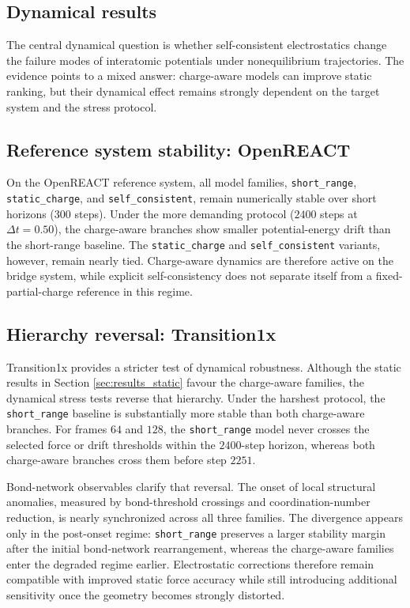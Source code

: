 \subsection{Dynamical results}
\label{sec:results_dynamics}

The central dynamical question is whether self-consistent electrostatics change the failure modes of interatomic potentials under nonequilibrium trajectories. The evidence points to a mixed answer: charge-aware models can improve static ranking, but their dynamical effect remains strongly dependent on the target system and the stress protocol.

\subsection{Reference system stability: OpenREACT}
On the OpenREACT reference system, all model families, \texttt{short\_range}, \texttt{static\_charge}, and \texttt{self\_consistent}, remain numerically stable over short horizons ($300$ steps). Under the more demanding protocol ($2400$ steps at $\Delta t = 0.50$), the charge-aware branches show smaller potential-energy drift than the short-range baseline. The \texttt{static\_charge} and \texttt{self\_consistent} variants, however, remain nearly tied. Charge-aware dynamics are therefore active on the bridge system, while explicit self-consistency does not separate itself from a fixed-partial-charge reference in this regime.

\subsection{Hierarchy reversal: Transition1x}
Transition1x provides a stricter test of dynamical robustness. Although the static results in Section \ref{sec:results_static} favour the charge-aware families, the dynamical stress tests reverse that hierarchy. Under the harshest protocol, the \texttt{short\_range} baseline is substantially more stable than both charge-aware branches. For frames $64$ and $128$, the \texttt{short\_range} model never crosses the selected force or drift thresholds within the $2400$-step horizon, whereas both charge-aware branches cross them before step $2251$.

Bond-network observables clarify that reversal. The onset of local structural anomalies, measured by bond-threshold crossings and coordination-number reduction, is nearly synchronized across all three families. The divergence appears only in the post-onset regime: \texttt{short\_range} preserves a larger stability margin after the initial bond-network rearrangement, whereas the charge-aware families enter the degraded regime earlier. Electrostatic corrections therefore remain compatible with improved static force accuracy while still introducing additional sensitivity once the geometry becomes strongly distorted.

